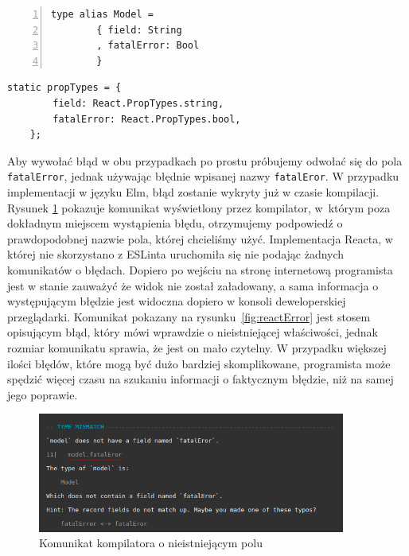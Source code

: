 \begin{minipage}{.45\textwidth}
	\begin{lstlisting}[style=elm-style,label = listing:elmmodel, numbers=left, stepnumber=1]
	type alias Model =
		{ field: String
		, fatalError: Bool
		}
	\end{lstlisting}
\end{minipage}\hfill
\begin{minipage}{.45\textwidth}
	\begin{lstlisting}[style=JavaScript,firstnumber=1,label = listing:reactprops]
	static propTypes = {
		field: React.PropTypes.string,
		fatalError: React.PropTypes.bool,
	};
	\end{lstlisting}
\end{minipage}

Aby wywołać błąd w obu przypadkach po prostu próbujemy odwołać się do pola \lstinline{fatalError}, jednak używając błędnie wpisanej nazwy \lstinline{fatalEror}. W przypadku implementacji w języku Elm, błąd zostanie wykryty już w czasie kompilacji. Rysunek \ref{fig:elmError} pokazuje komunikat wyświetlony przez kompilator, w~którym poza dokładnym miejscem wystąpienia błędu, otrzymujemy podpowiedź o prawdopodobnej nazwie pola, której chcieliśmy użyć. Implementacja Reacta, w której nie skorzystano z ESLinta uruchomiła się nie podając żadnych komunikatów o błędach. Dopiero po wejściu na stronę internetową programista jest w stanie zauważyć że widok nie został załadowany, a sama informacja o występującym błędzie jest widoczna dopiero w konsoli deweloperskiej przeglądarki. Komunikat pokazany na rysunku~\ref{fig:reactError} jest stosem opisującym błąd, który mówi wprawdzie o nieistniejącej właściwości, jednak rozmiar komunikatu sprawia, że jest on mało czytelny. W przypadku większej ilości błędów, które mogą być dużo bardziej skomplikowane, programista może spędzić więcej czasu na szukaniu informacji o faktycznym błędzie, niż na samej jego poprawie.

\begin{figure}[h]
	\centering
	\includegraphics[width=0.9\textwidth]{images/elm_error}
	\caption{Komunikat kompilatora o nieistniejącym polu}
	\label{fig:elmError}
\end{figure}


